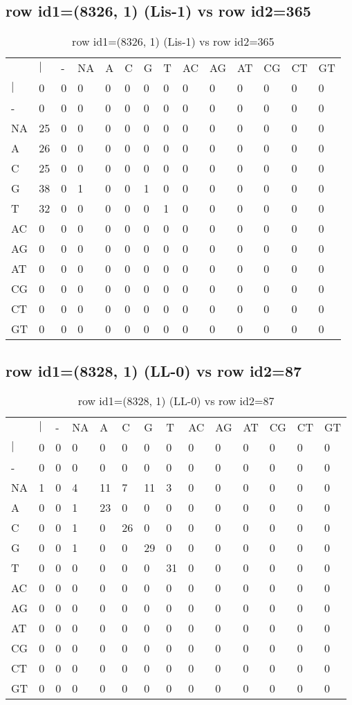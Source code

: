 \subsection{row id1=(8326, 1) (Lis-1) vs row id2=365}
\begin{center}
\begin{longtable}{|l|l|l|l|l|l|l|l|l|l|l|l|l|l|}
\caption{row id1=(8326, 1) (Lis-1) vs row id2=365} \label{table_dm330}\\
\hline
\\
\hline
&$|$&-&NA&A&C&G&T&AC&AG&AT&CG&CT&GT\\
$|$&0&0&0&0&0&0&0&0&0&0&0&0&0\\
-&0&0&0&0&0&0&0&0&0&0&0&0&0\\
NA&25&0&0&0&0&0&0&0&0&0&0&0&0\\
A&26&0&0&0&0&0&0&0&0&0&0&0&0\\
C&25&0&0&0&0&0&0&0&0&0&0&0&0\\
G&38&0&1&0&0&1&0&0&0&0&0&0&0\\
T&32&0&0&0&0&0&1&0&0&0&0&0&0\\
AC&0&0&0&0&0&0&0&0&0&0&0&0&0\\
AG&0&0&0&0&0&0&0&0&0&0&0&0&0\\
AT&0&0&0&0&0&0&0&0&0&0&0&0&0\\
CG&0&0&0&0&0&0&0&0&0&0&0&0&0\\
CT&0&0&0&0&0&0&0&0&0&0&0&0&0\\
GT&0&0&0&0&0&0&0&0&0&0&0&0&0\\
\hline
\end{longtable}
\end{center}

\subsection{row id1=(8328, 1) (LL-0) vs row id2=87}
\begin{center}
\begin{longtable}{|l|l|l|l|l|l|l|l|l|l|l|l|l|l|}
\caption{row id1=(8328, 1) (LL-0) vs row id2=87} \label{table_dm332}\\
\hline
\\
\hline
&$|$&-&NA&A&C&G&T&AC&AG&AT&CG&CT&GT\\
$|$&0&0&0&0&0&0&0&0&0&0&0&0&0\\
-&0&0&0&0&0&0&0&0&0&0&0&0&0\\
NA&1&0&4&11&7&11&3&0&0&0&0&0&0\\
A&0&0&1&23&0&0&0&0&0&0&0&0&0\\
C&0&0&1&0&26&0&0&0&0&0&0&0&0\\
G&0&0&1&0&0&29&0&0&0&0&0&0&0\\
T&0&0&0&0&0&0&31&0&0&0&0&0&0\\
AC&0&0&0&0&0&0&0&0&0&0&0&0&0\\
AG&0&0&0&0&0&0&0&0&0&0&0&0&0\\
AT&0&0&0&0&0&0&0&0&0&0&0&0&0\\
CG&0&0&0&0&0&0&0&0&0&0&0&0&0\\
CT&0&0&0&0&0&0&0&0&0&0&0&0&0\\
GT&0&0&0&0&0&0&0&0&0&0&0&0&0\\
\hline
\end{longtable}
\end{center}

